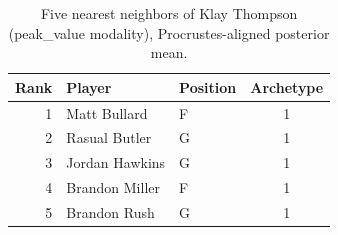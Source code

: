 \begin{table}[htbp]
  \centering\small
  \begin{tabular}{rllc}
    \toprule
    Rank & Player & Position & Archetype \\
    \midrule
    1 & Matt Bullard & F & 1 \\
    2 & Rasual Butler & G & 1 \\
    3 & Jordan Hawkins & G & 1 \\
    4 & Brandon Miller & F & 1 \\
    5 & Brandon Rush & G & 1 \\
    \bottomrule
  \end{tabular}
  \caption{Five nearest neighbors of Klay Thompson (peak_value modality), Procrustes-aligned posterior mean.}
  \label{tab:Klay_Thompson_neighbors_peak_value}
\end{table}

